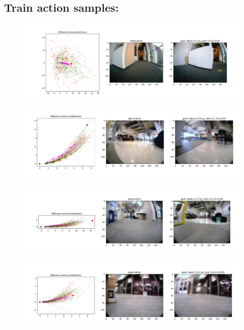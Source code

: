 \documentclass[12pt]{article}
\begin{document}
\subsection*{Train action samples:}
\begin{figure}[H]
    \includegraphics[width=\textwidth]{images/train_action_samples_1.png}    
    \label{fig:train_action_samples_1}
\end{figure}
\begin{figure}[H]
    \includegraphics[width=\textwidth]{images/train_action_samples_2.png}
    \label{fig:train_action_samples_1}
\end{figure}
\begin{figure}[H]
    \includegraphics[width=\textwidth]{images/train_action_samples_3.png}
    \label{fig:train_action_samples_1}
\end{figure}
\begin{figure}[H]
    \includegraphics[width=\textwidth]{images/train_action_samples_4.png}
    \label{fig:train_action_samples_1}
\end{figure}
\end{document}
